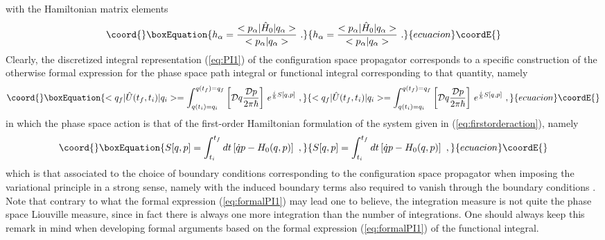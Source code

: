 \documentclass[a4paper,11pt]{article}
\begin{document}
with the Hamiltonian matrix elements
\begin{equation}\coord{}\boxEquation{
h_\alpha=\frac{<p_\alpha|\hat{H}_0|q_\alpha>}
{<p_\alpha|q_\alpha>}\ .
}{
h_\alpha=\frac{<p_\alpha|\hat{H}_0|q_\alpha>}
{<p_\alpha|q_\alpha>}\ .
}{ecuacion}\coordE{}\end{equation}
Clearly, the discretized integral representation (\ref{eq:PI1}) of
the configuration space propagator corresponds to a specific construction
of the otherwise formal expression for the phase space path integral
or functional integral corresponding to that quantity, namely
\begin{equation}\coord{}\boxEquation{
<q_f|\hat{U}(t_f,t_i)|q_i>=
\int_{q(t_i)=q_i}^{q(t_f)=q_f}
\left[{\cal D}q\frac{{\cal D}p}{2\pi\hbar}\right]\,
e^{\frac{i}{\hbar}S[q,p]}\ ,
\label{eq:formalPI1}
}{
<q_f|\hat{U}(t_f,t_i)|q_i>=
\int_{q(t_i)=q_i}^{q(t_f)=q_f}
\left[{\cal D}q\frac{{\cal D}p}{2\pi\hbar}\right]\,
e^{\frac{i}{\hbar}S[q,p]}\ ,
}{ecuacion}\coordE{}\end{equation}
in which the phase space action is that of the first-order Hamiltonian 
formulation of the system given in (\ref{eq:firstorderaction}), namely
\begin{equation}\coord{}\boxEquation{
S[q,p]=\int_{t_i}^{t_f}dt\left[\dot{q}p-H_0(q,p)\right]\ ,
}{
S[q,p]=\int_{t_i}^{t_f}dt\left[\dot{q}p-H_0(q,p)\right]\ ,
}{ecuacion}\coordE{}\end{equation}
which is that associated to the choice of boundary conditions corresponding
to the configuration space propagator when imposing the variational
principle in a strong sense, namely with the induced boundary terms also
required to vanish through the boundary conditions \coordHE{}. 
Note that contrary to what the formal
expression (\ref{eq:formalPI1}) may lead one to believe, the integration
measure is not quite the phase space Liouville measure, since in fact
there is always one more \coordHE{} integration than the number of \coordHE{} 
integrations. One should always keep this remark in mind when developing
formal arguments based on the formal expression (\ref{eq:formalPI1})
of the functional integral.
\end{document}

